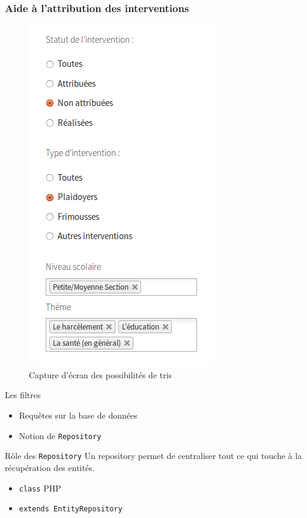 \speaker{\Julie}

\begin{frame}
\frametitle{Aide à l'attribution des interventions}
	\begin{minipage}[c]{.40\linewidth}
      \begin{figure}[r]
		\includegraphics[scale=0.3]{images/filtreListeIntervention.png}
		\caption{Capture d'écran des possibilités de tris}
	  \end{figure}
   \end{minipage} \hfill
   \begin{minipage}[c]{.52\linewidth}
      \begin{block}{Les filtres}
		\begin{itemize}
			\item Requêtes sur la base de données
			\item Notion de \texttt{Repository}
		\end{itemize}
	  \end{block}
	  \begin{block}{Rôle des \texttt{Repository}}
		Un repository permet de centraliser tout ce qui touche à la récupération des entités.
		\begin{itemize}
		\item \texttt{class} PHP
		\item \texttt{extends EntityRepository}
		\end{itemize}
	  \end{block}
   \end{minipage} \hfill
\end{frame}

